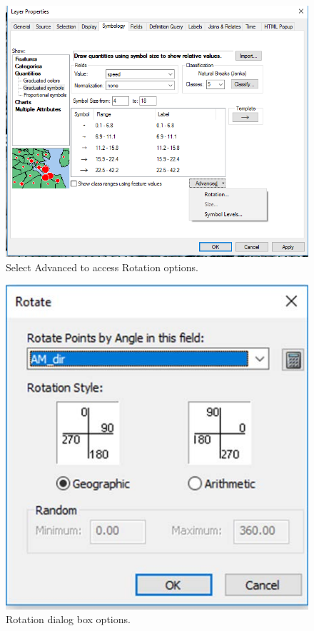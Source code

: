 \documentclass[12pt]{article}
\begin{document}
\begin{enumerate}[resume]
\begin{figure}[H]
	\centering
	\includegraphics[scale=0.35]{arc_8.png}
	\caption{Select Advanced to access Rotation options.}
\label{fig:Figure8}
\end{figure}

\begin{figure}[H]
	\centering
	\includegraphics[scale=0.35]{arc_9.png}
	\caption{Rotation dialog box options.}
\label{fig:Figure9}
\end{figure}


\end{enumerate}
\end{document}
